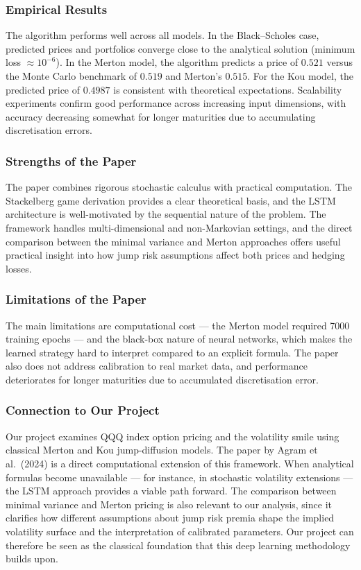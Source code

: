 \documentclass[12pt,a4paper]{article}
\begin{document}
\subsubsection*{Empirical Results}

The algorithm performs well across all models. In the Black--Scholes case, predicted prices and portfolios converge close to the analytical solution (minimum loss $\approx 10^{-6}$). In the Merton model, the algorithm predicts a price of $0.521$ versus the Monte Carlo benchmark of $0.519$ and Merton's $0.515$. For the Kou model, the predicted price of $0.4987$ is consistent with theoretical expectations. Scalability experiments confirm good performance across increasing input dimensions, with accuracy decreasing somewhat for longer maturities due to accumulating discretisation errors.

\subsubsection*{Strengths of the Paper}

The paper combines rigorous stochastic calculus with practical computation. The Stackelberg game derivation provides a clear theoretical basis, and the LSTM architecture is well-motivated by the sequential nature of the problem. The framework handles multi-dimensional and non-Markovian settings, and the direct comparison between the minimal variance and Merton approaches offers useful practical insight into how jump risk assumptions affect both prices and hedging losses.

\subsubsection*{Limitations of the Paper}

The main limitations are computational cost --- the Merton model required 7000 training epochs --- and the black-box nature of neural networks, which makes the learned strategy hard to interpret compared to an explicit formula. The paper also does not address calibration to real market data, and performance deteriorates for longer maturities due to accumulated discretisation error.

\subsubsection*{Connection to Our Project}

Our project examines QQQ index option pricing and the volatility smile using classical Merton and Kou jump-diffusion models. The paper by Agram et al.\ (2024) is a direct computational extension of this framework. When analytical formulas become unavailable --- for instance, in stochastic volatility extensions --- the LSTM approach provides a viable path forward. The comparison between minimal variance and Merton pricing is also relevant to our analysis, since it clarifies how different assumptions about jump risk premia shape the implied volatility surface and the interpretation of calibrated parameters. Our project can therefore be seen as the classical foundation that this deep learning methodology builds upon.
\end{document}

